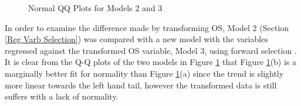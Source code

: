 \documentclass[11pt,a4paper]{report}
\begin{document}
\begin{figure}[h]
	\centering
	\caption{Normal QQ Plots for Models 2 and 3}
	\label{fig:QQ Comparison}
\end{figure}

In order to examine the difference made by transforming \ac{OS}, Model 2 (Section \ref{Reg Varb Selection}) was compared with a new model with the variables regressed against the transformed \ac{OS} variable, Model 3, using forward selection . It is clear from the Q-Q plots of the two models in Figure \ref{fig:QQ Comparison} that Figure \ref{fig:QQ Comparison}(b) is a marginally better fit for normality than Figure \ref{fig:QQ Comparison}(a) since the trend is slightly more linear towards the left hand tail, however the transformed data is still suffers with a lack of normality. 
\end{document}
